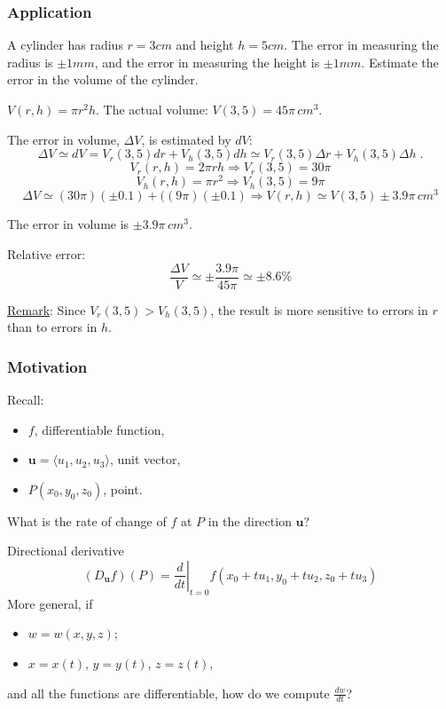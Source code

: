 \begin{frame}
  \frametitle{Application}

  A cylinder has radius $r=3cm$ and height $h=5cm$. The error in measuring the radius is $\pm 1 mm$, and the error in measuring the height is $\pm 1 mm$. Estimate the error in the volume of the cylinder.
\pause
\bigskip

$V(r,h) = \pi r^2 h$. The actual volume: $V(3,5) = 45\pi \, cm^3$.

\pause
The error in volume, $\Delta V$, is estimated by $dV$:
%
$$\Delta V \simeq dV = V _r(3,5) dr + V_h(3,5) dh \simeq V _r(3,5) \Delta r + V_h(3,5) \Delta h\; .$$
%
$$V_r(r,h) = 2\pi r h \Longrightarrow V_r(3,5) = 30 \pi$$
%
$$V_h(r,h) = \pi r^2 \Longrightarrow V_h(3,5) = 9\pi$$
%
$$\Delta V  \simeq (30\pi) (\pm 0.1) + ((9\pi)(\pm 0.1) \Longrightarrow V(r,h) \simeq V(3,5) \pm 3.9\pi \, cm^3$$

The error in volume is $\pm 3.9\pi \, cm^3$.

\pause
Relative error:
%
$$\frac{\Delta V}{V} \simeq \pm \frac{3.9 \pi}{45\pi} \simeq \pm 8.6\%$$

\medskip
\pause
\underline{Remark}: Since $V_r(3,5) > V_h(3,5)$, the result is more sensitive to errors in $r$ than to errors in $h$.
\end{frame}

\begin{frame}
  \frametitle{Motivation}

Recall:
\begin{itemize}
  \item $f$, differentiable function,
  \item $\textbf{u}=\langle u_1,u_2,u_3 \rangle$, unit vector,
  \item $P(x_0,y_0,z_0)$, point.
\end{itemize}
%
What is the rate of change of $f$ at $P$ in the direction $\textbf{u}$?

\pause
Directional derivative
%
$$(D_{\textbf{u}}f)(P) = \left. \frac{d}{dt}\right|_{t=0} f(x_0+tu_1, y_0+tu_2,z_0+tu_3)$$
%
\pause
More general, if
\begin{itemize}
\item $w=w(x,y,z)$;
\item $x=x(t)$, $y=y(t)$, $z=z(t)$,
\end{itemize}
%
and all the functions are differentiable, how do we compute $\frac{dw}{dt}$?
\end{frame}

